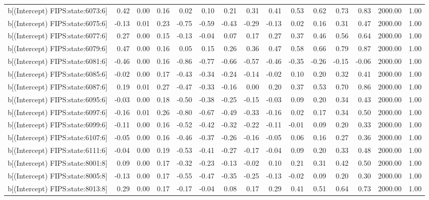 \begin{table}[ht]
\begin{tabular}{rrrrrrrrrrrrrrr}
  b[(Intercept) FIPS:state:6073:6] & 0.42 & 0.00 & 0.16 & 0.02 & 0.10 & 0.21 & 0.31 & 0.41 & 0.53 & 0.62 & 0.73 & 0.83 & 2000.00 & 1.00 \\ 
  b[(Intercept) FIPS:state:6075:6] & -0.13 & 0.01 & 0.23 & -0.75 & -0.59 & -0.43 & -0.29 & -0.13 & 0.02 & 0.16 & 0.31 & 0.47 & 2000.00 & 1.00 \\ 
  b[(Intercept) FIPS:state:6077:6] & 0.27 & 0.00 & 0.15 & -0.13 & -0.04 & 0.07 & 0.17 & 0.27 & 0.37 & 0.46 & 0.56 & 0.64 & 2000.00 & 1.00 \\ 
  b[(Intercept) FIPS:state:6079:6] & 0.47 & 0.00 & 0.16 & 0.05 & 0.15 & 0.26 & 0.36 & 0.47 & 0.58 & 0.66 & 0.79 & 0.87 & 2000.00 & 1.00 \\ 
  b[(Intercept) FIPS:state:6081:6] & -0.46 & 0.00 & 0.16 & -0.86 & -0.77 & -0.66 & -0.57 & -0.46 & -0.35 & -0.26 & -0.15 & -0.06 & 2000.00 & 1.00 \\ 
  b[(Intercept) FIPS:state:6085:6] & -0.02 & 0.00 & 0.17 & -0.43 & -0.34 & -0.24 & -0.14 & -0.02 & 0.10 & 0.20 & 0.32 & 0.41 & 2000.00 & 1.00 \\ 
  b[(Intercept) FIPS:state:6087:6] & 0.19 & 0.01 & 0.27 & -0.47 & -0.33 & -0.16 & 0.00 & 0.20 & 0.37 & 0.53 & 0.70 & 0.86 & 2000.00 & 1.00 \\ 
  b[(Intercept) FIPS:state:6095:6] & -0.03 & 0.00 & 0.18 & -0.50 & -0.38 & -0.25 & -0.15 & -0.03 & 0.09 & 0.20 & 0.34 & 0.43 & 2000.00 & 1.00 \\ 
  b[(Intercept) FIPS:state:6097:6] & -0.16 & 0.01 & 0.26 & -0.80 & -0.67 & -0.49 & -0.33 & -0.16 & 0.02 & 0.17 & 0.34 & 0.50 & 2000.00 & 1.00 \\ 
  b[(Intercept) FIPS:state:6099:6] & -0.11 & 0.00 & 0.16 & -0.52 & -0.42 & -0.32 & -0.22 & -0.11 & -0.01 & 0.09 & 0.20 & 0.33 & 2000.00 & 1.00 \\ 
  b[(Intercept) FIPS:state:6107:6] & -0.05 & 0.00 & 0.16 & -0.46 & -0.37 & -0.26 & -0.16 & -0.05 & 0.06 & 0.16 & 0.27 & 0.36 & 2000.00 & 1.00 \\ 
  b[(Intercept) FIPS:state:6111:6] & -0.04 & 0.00 & 0.19 & -0.53 & -0.41 & -0.27 & -0.17 & -0.04 & 0.09 & 0.20 & 0.33 & 0.48 & 2000.00 & 1.00 \\ 
  b[(Intercept) FIPS:state:8001:8] & 0.09 & 0.00 & 0.17 & -0.32 & -0.23 & -0.13 & -0.02 & 0.10 & 0.21 & 0.31 & 0.42 & 0.50 & 2000.00 & 1.00 \\ 
  b[(Intercept) FIPS:state:8005:8] & -0.13 & 0.00 & 0.17 & -0.55 & -0.47 & -0.35 & -0.25 & -0.13 & -0.02 & 0.09 & 0.20 & 0.30 & 2000.00 & 1.00 \\ 
  b[(Intercept) FIPS:state:8013:8] & 0.29 & 0.00 & 0.17 & -0.17 & -0.04 & 0.08 & 0.17 & 0.29 & 0.41 & 0.51 & 0.64 & 0.73 & 2000.00 & 1.00 \\ 

\end{tabular}
\end{table}
